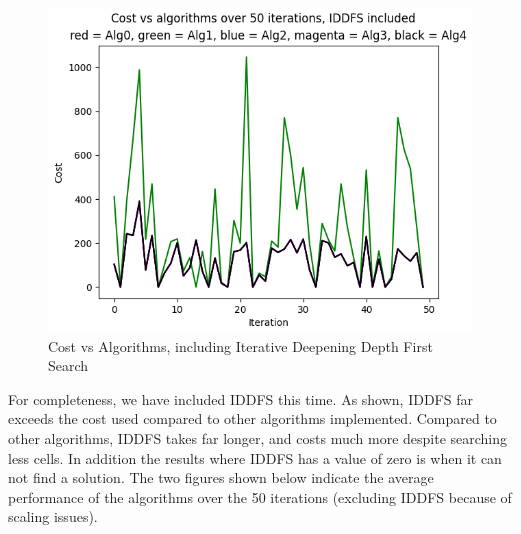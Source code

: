 \documentclass[a4paper]{article}
\begin{document}
\begin{figure}[ht]
    \centering
    \includegraphics[width=\textwidth]{CVA50IDDFS.png}
    \caption{Cost vs Algorithms, including Iterative Deepening Depth First Search}
    \label{fig:CostVsAlgsIDDFS}
\end{figure}
For completeness, we have included IDDFS this time. As shown, IDDFS far exceeds the cost used compared to other algorithms implemented. Compared to other algorithms, IDDFS takes far longer, and costs much more despite searching less cells. In addition the results where IDDFS has a value of zero is when it can not find a solution. The two figures shown below indicate the average performance of the algorithms over the 50 iterations (excluding IDDFS because of scaling issues).
\end{document}
